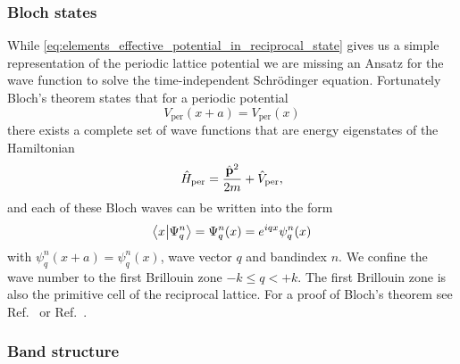 \subsubsection{Bloch states}

While \cref{eq:elements_effective_potential_in_reciprocal_state} gives us a
simple representation of the periodic lattice potential we are missing an
Ansatz for the wave function to solve the time-independent Schrödinger
equation. Fortunately Bloch's theorem states that for a periodic potential
\begin{equation}
  V_\text{per}(x+a)=V_\text{per}(x)
  \label{eq:potential_periodic}
\end{equation}
there exists a complete set of wave functions that are energy eigenstates
of the Hamiltonian
\begin{equation}
  \hat{H}_\text{per}
  =\frac{\hat{\vb{p}}^2}{2m}+\hat{V}_\text{per}
  \label{eq:hamiltonian_periodic},
\end{equation}
and each of these Bloch waves can be written into the form
\begin{equation}
  \bra{x}\ket{\Psi^n_q}
  =\Psi^n_q(x)
  =e^{iqx}\psi^n_q(x)
  \label{eq:state_bloch}
\end{equation}
with $\psi^n_q(x+a)=\psi^n_q(x)$, wave vector $q$ and bandindex $n$. We
confine the wave number to the first Brillouin zone $-k\leq q<+k$. The
first Brillouin zone is also the primitive cell of the reciprocal lattice. For
a proof of Bloch's theorem see Ref.~\cite{Roessler2004} or
Ref.~\cite{Bartelmann2018}.

\subsubsection{Band structure}

